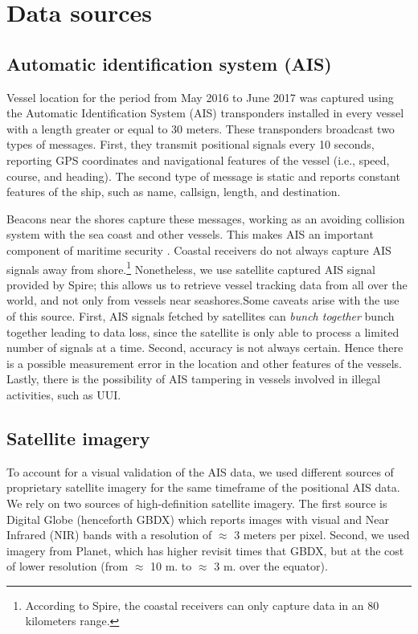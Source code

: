 \section{Data sources}
\subsection{Automatic identification system (AIS)}
Vessel location for the period from May 2016 to June 2017  was captured using the Automatic  Identification System (AIS) transponders installed in every vessel with a length greater or equal to 30 meters. These transponders broadcast two types of messages. First, they transmit positional signals every 10 seconds, reporting GPS coordinates and navigational features of the vessel (i.e., speed, course, and heading). The second type of message is static and reports constant features of the ship, such as name, callsign, length, and destination. 

Beacons near the shores capture these messages, working as an avoiding collision system with the sea coast and other vessels. This makes AIS an important component of maritime security \cite{Tetreault2005}. Coastal receivers do not always capture AIS signals away from shore.\footnote{According to Spire, the coastal receivers can only capture data in an 80 kilometers range.} Nonetheless, we use satellite captured AIS signal provided by Spire; this allows us to retrieve vessel tracking data from all over the world, and not only from vessels near seashores.Some caveats arise with the use of this source. First, AIS signals fetched by satellites can \textit{bunch together} bunch together leading to data loss, since the satellite is only able to process a limited number of signals at a time. Second, accuracy is not always certain. Hence there is a possible measurement error in the location and other features of the vessels. Lastly, there is the possibility of AIS tampering in vessels involved in illegal activities, such as UUI. 

\subsection{Satellite imagery}

To account for a visual validation of the AIS data, we used different sources of proprietary satellite imagery for the same timeframe of the positional AIS data. We rely on two sources of high-definition satellite imagery. The first source is Digital Globe (henceforth GBDX) which reports images with visual and Near Infrared (NIR) bands with a resolution of $\approx$ 3 meters per pixel. Second, we used imagery from Planet, which has higher revisit times that GBDX, but at the cost of lower resolution (from $\approx$ 10 m. to $\approx$ 3 m. over the equator). 

